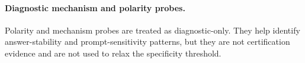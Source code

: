 \paragraph{Diagnostic mechanism and polarity probes.}
Polarity and mechanism probes are treated as diagnostic-only. They help identify answer-stability and prompt-sensitivity patterns, but they are not certification evidence and are not used to relax the specificity threshold.
